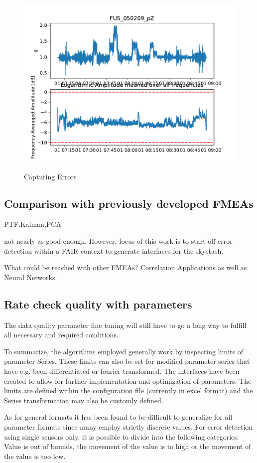 \begin{figure}
    \centering
    \includegraphics[width=.7\textwidth]{03_figures/python_functions/images/FUS_050209}
    \label{fig:res_050209}
    \caption{Capturing Errors}
\end{figure}






\subsection{Comparison with previously developed FMEAs}
PTF,Kalman,PCA

not nearly as good enough. However, focus of this work is to start off error detection within a FAIR context to generate interfaces for the skystash.

What could be reached with other FMEAs? Correlation Applications as well as Neural Networks.


\subsection{Rate check quality with parameters}
The data quality parameter fine tuning will still have to go a long way to fulfill all necessary and required conditions.

To summarize, the algorithms employed generally work by inspecting limits of parameter Series. These limits can also be set for modified parameter series that have e.g. been differentiated or fourier transformed. The interfaces have been created to allow for further implementation and optimization of parameters. The limits are defined within the configuration file (currently in excel format) and the Series transformation may also be customly defined.

As for general formats it has been found to be difficult to generalize for all parameter formats since many employ strictly discrete values. For error detection using single sensors only, it is possible to divide into the following categories: Value is out of bounds, the movement of the value is to high or the movement of the value is too low.

